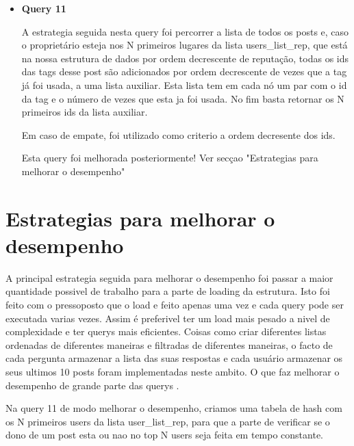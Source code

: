 \documentclass[a4paper,10pt]{article}
\begin{document}
\begin{itemize}
  \item \textbf{Query 11}
    
    \quad\quad A estrategia seguida nesta query foi percorrer a lista de todos os posts e, caso o propriet\'ario esteja nos N primeiros lugares da lista users\_list\_rep, que est\'a na nossa estrutura de dados por ordem decrescente de reputa\c{c}\~ao, todas os ids das tags desse post s\~ao adicionados por ordem decrescente de vezes que a tag j\'a foi usada, a uma lista auxiliar. Esta lista tem em cada n\'o um par com o id da tag e o n\'umero de vezes que esta ja foi usada. No fim basta retornar os N primeiros ids da lista auxiliar.
    
    \quad\quad Em caso de empate, foi utilizado como criterio a ordem decresente dos ids.
    
    \quad\quad Esta query foi melhorada posteriormente! Ver sec\c{c}ao "Estrategias para melhorar o desempenho"
    
    \end{itemize}
    
    \section {Estrategias para melhorar o desempenho}
    
    \quad A principal estrategia seguida para melhorar o desempenho foi passar a maior quantidade possivel de trabalho para a parte de loading da estrutura. Isto foi feito com o pressoposto que o load e feito apenas uma vez e cada query pode ser executada varias vezes. Assim \'e preferivel ter um load mais pesado a nivel de complexidade e ter querys  mais eficientes. Coisas como criar diferentes listas ordenadas de diferentes maneiras e filtradas de diferentes maneiras, o facto de cada pergunta armazenar a lista das suas respostas e cada usu\'ario armazenar os seus ultimos 10 posts foram implementadas neste ambito. O que faz melhorar o desempenho de grande parte das querys .

    \quad Na query 11 de modo melhorar o desempenho, criamos uma tabela de hash com os N primeiros users da lista user\_list\_rep, para que a parte de verificar se o dono de um post esta ou nao no top N users seja feita em tempo constante.
    
\end{document}
